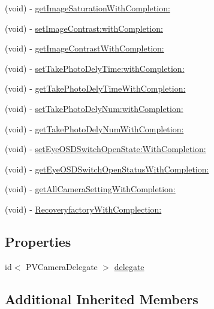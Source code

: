 \begin{DoxyCompactItemize}
(void) -\/ \hyperlink{interface_p_v_camera_aaf8754475a0f68f3a12c83df9b5bdbc8}{get\+Image\+Saturation\+With\+Completion\+:}
\item 
(void) -\/ \hyperlink{interface_p_v_camera_ab8dd6bc65ff3a01571c87a80bcb60b71}{set\+Image\+Contrast\+:with\+Completion\+:}
\item 
(void) -\/ \hyperlink{interface_p_v_camera_a9899f3f0aed287bf70aea47cb6b83f7a}{get\+Image\+Contrast\+With\+Completion\+:}
\item 
(void) -\/ \hyperlink{interface_p_v_camera_a1025de7edd08b2aa6a020bb484746c8d}{set\+Take\+Photo\+Dely\+Time\+:with\+Completion\+:}
\item 
(void) -\/ \hyperlink{interface_p_v_camera_a1eb89b76d160e7445e6f31f4bdfb3e44}{get\+Take\+Photo\+Dely\+Time\+With\+Completion\+:}
\item 
(void) -\/ \hyperlink{interface_p_v_camera_a9e9449489b48af1f823624e0ade0da87}{set\+Take\+Photo\+Dely\+Num\+:with\+Completion\+:}
\item 
(void) -\/ \hyperlink{interface_p_v_camera_a98d62c4d59b5135ea417ea32e5c9e9d0}{get\+Take\+Photo\+Dely\+Num\+With\+Completion\+:}
\item 
(void) -\/ \hyperlink{interface_p_v_camera_a195b2a1c7389abf1b15364ccd040e87b}{set\+Eye\+O\+S\+D\+Switch\+Open\+State\+:\+With\+Completion\+:}
\item 
(void) -\/ \hyperlink{interface_p_v_camera_a91b67612ede6ee6fd48ffeb5f2f25522}{get\+Eye\+O\+S\+D\+Switch\+Open\+Status\+With\+Completion\+:}
\item 
(void) -\/ \hyperlink{interface_p_v_camera_a71b184d20bacc87de2e76a06c24e0eef}{get\+All\+Camera\+Setting\+With\+Completion\+:}
\item 
(void) -\/ \hyperlink{interface_p_v_camera_a15af755b1d1134416671cd684ecab824}{Recoveryfactory\+With\+Complection\+:}
\end{DoxyCompactItemize}
\subsection*{Properties}
\begin{DoxyCompactItemize}
\item 
id$<$ P\+V\+Camera\+Delegate $>$ \hyperlink{interface_p_v_camera_a34581adb3bd0cb12122ac7ea80ec57ed}{delegate}
\end{DoxyCompactItemize}
\subsection*{Additional Inherited Members}


